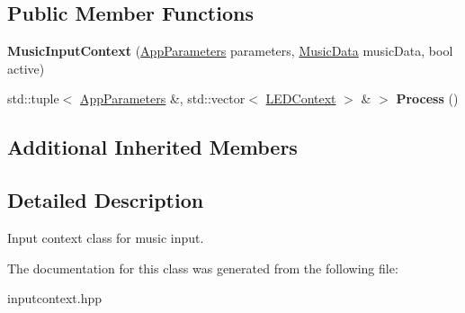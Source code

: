 \subsection*{Public Member Functions}
\begin{DoxyCompactItemize}
\item 
\mbox{\label{classMusicInputContext_a3a684341715ba5a6db949843564d8bae}} 
{\bfseries Music\+Input\+Context} (\hyperlink{structAppParameters}{App\+Parameters} parameters, \hyperlink{structMusicData}{Music\+Data} music\+Data, bool active)
\item 
\mbox{\label{classMusicInputContext_a3ebc756c72a1f7978f00ff10141291c8}} 
std\+::tuple$<$ \hyperlink{structAppParameters}{App\+Parameters} \&, std\+::vector$<$ \hyperlink{classLEDContext}{L\+E\+D\+Context} $>$ \& $>$ {\bfseries Process} ()
\end{DoxyCompactItemize}
\subsection*{Additional Inherited Members}


\subsection{Detailed Description}
Input context class for music input. 

The documentation for this class was generated from the following file\+:\begin{DoxyCompactItemize}
\item 
inputcontext.\+hpp\end{DoxyCompactItemize}
